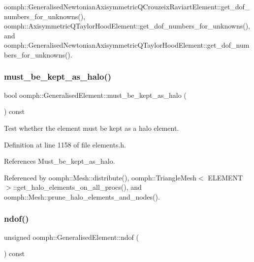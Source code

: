 oomph\+::\+Generalised\+Newtonian\+Axisymmetric\+Q\+Crouzeix\+Raviart\+Element\+::get\+\_\+dof\+\_\+numbers\+\_\+for\+\_\+unknowns(), oomph\+::\+Axisymmetric\+Q\+Taylor\+Hood\+Element\+::get\+\_\+dof\+\_\+numbers\+\_\+for\+\_\+unknowns(), and oomph\+::\+Generalised\+Newtonian\+Axisymmetric\+Q\+Taylor\+Hood\+Element\+::get\+\_\+dof\+\_\+numbers\+\_\+for\+\_\+unknowns().

\mbox{\label{classoomph_1_1GeneralisedElement_a6bfd80be22c82459b6029ca1202c8f36}} 
\subsubsection{\texorpdfstring{must\+\_\+be\+\_\+kept\+\_\+as\+\_\+halo()}{must\_be\_kept\_as\_halo()}}
{\footnotesize\ttfamily bool oomph\+::\+Generalised\+Element\+::must\+\_\+be\+\_\+kept\+\_\+as\+\_\+halo (\begin{DoxyParamCaption}{ }\end{DoxyParamCaption}) const\hspace{0.3cm}{\ttfamily [inline]}}



Test whether the element must be kept as a halo element. 



Definition at line 1158 of file elements.\+h.



References Must\+\_\+be\+\_\+kept\+\_\+as\+\_\+halo.



Referenced by oomph\+::\+Mesh\+::distribute(), oomph\+::\+Triangle\+Mesh$<$ E\+L\+E\+M\+E\+N\+T $>$\+::get\+\_\+halo\+\_\+elements\+\_\+on\+\_\+all\+\_\+procs(), and oomph\+::\+Mesh\+::prune\+\_\+halo\+\_\+elements\+\_\+and\+\_\+nodes().

\mbox{\label{classoomph_1_1GeneralisedElement_a37204f67b37d212fd170c68d48f6da57}} 
\subsubsection{\texorpdfstring{ndof()}{ndof()}}
{\footnotesize\ttfamily unsigned oomph\+::\+Generalised\+Element\+::ndof (\begin{DoxyParamCaption}{ }\end{DoxyParamCaption}) const\hspace{0.3cm}{\ttfamily [inline]}}



